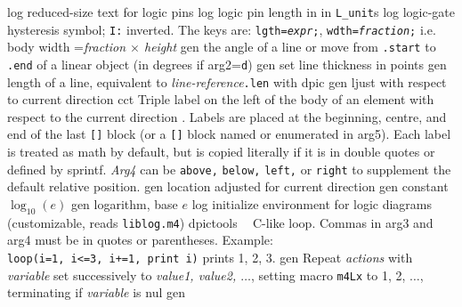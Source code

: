 %
  {log}%
  {reduced-size text for logic pins}%
%
  {log}%
  {logic pin length in in {\tt L\_unit}s}%
%
  {log}%
  {logic-gate hysteresis symbol; {\tt I:} inverted. The keys are:
    {\tt lgth={\sl expr};}, 
    {\tt wdth={\sl fraction};} i.e. body width ={\sl fraction $\times$ height}}%
%
  {gen}%
  {the angle of a line or move from {\tt .start} to {\tt .end} of a linear
   object (in degrees if arg2={\tt d})}%
%
  {gen}%
  {set line thickness in points}%
%
  {gen}%
  {length of a line, equivalent to {\sl line-reference}{\tt .len}
   with dpic}%
%
  {gen}%
  {ljust with respect to current direction}%
%
  {cct}%
  {Triple label on the left of the body of an element with respect to the
    current direction .  Labels are placed at the
    beginning, centre, and end of the last {\tt []} block (or a {\tt []} block
    named or enumerated in arg5). Each label is treated as math by
    default, but is copied literally if it is in double quotes or defined
    by sprintf.  {\sl Arg4} can be {\tt above,} {\tt below,} {\tt left,}
    or {\tt right} to supplement the default relative position.}%
%
  {gen}%
  {location adjusted for current direction}%
%
  {gen}%
  {constant $\log_{10}(e)$}%
%
  {gen}%
  {logarithm, base $e$}%
%
  {log}%
  {initialize environment for logic diagrams
    (customizable, reads {\tt liblog.m4})}%
%
  {dpictools}%
  {$\;\;$ C-like loop.  Commas in arg3 and arg4 must
    be in quotes or parentheses. Example:\\
    {\tt loop(i=1, i<=3, i+=1, print i)} prints 1, 2, 3.}%
%
  {gen}%
  {Repeat {\sl actions} with {\sl variable} set successively to
   {\sl value1, value2, $\ldots$}, setting macro {\tt m4Lx} to 1, 2,
   $\ldots$, terminating if {\sl variable} is nul}%
 {gen}%
